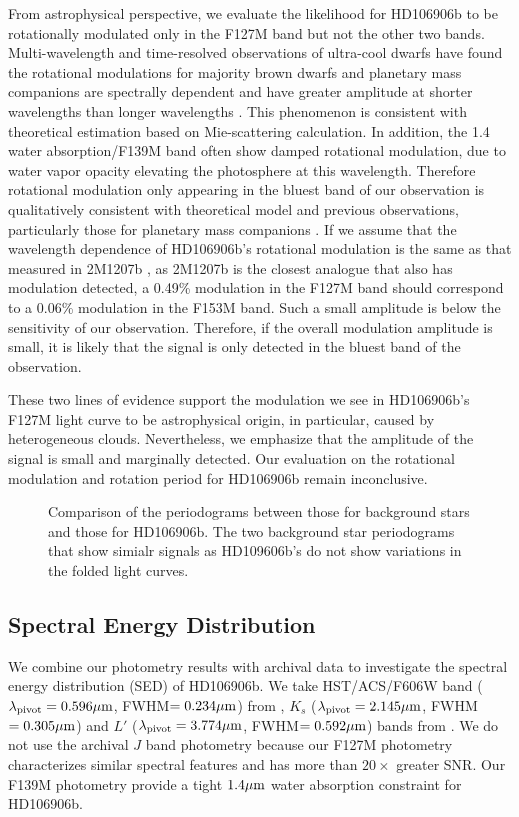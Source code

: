 \documentclass[modern]{aastex62}
\begin{document}
From astrophysical perspective, we evaluate the likelihood for HD106906b to be rotationally modulated only in the F127M band but not the other two bands. Multi-wavelength and time-resolved observations of ultra-cool dwarfs have found the rotational modulations for majority  brown dwarfs and planetary mass companions are spectrally dependent and have greater amplitude at shorter wavelengths than longer wavelengths \citep[e.g.,][]{Zhou2019,Zhou2016,Yang2014,Apai2013,Schlawin}. This phenomenon is consistent with theoretical estimation based on Mie-scattering calculation\citep{Schlawin,Hiranaka2016}. In addition, the 1.4 \micron{} water absorption/F139M band often show damped rotational modulation, due to water vapor opacity elevating the photosphere at this wavelength.  Therefore rotational modulation only appearing in the bluest band of our observation is qualitatively consistent with theoretical model and previous observations, particularly those for planetary mass companions \citep{Zhou2016,Zhou2019}. If we assume that the wavelength dependence of HD106906b's rotational modulation is the same as that measured in 2M1207b \citep{Zhou2016}, as 2M1207b is the closest analogue that also has modulation detected, a 0.49\% modulation in the F127M band should correspond to a 0.06\% modulation in the F153M band. Such a small amplitude is below the sensitivity of our observation. Therefore, if the overall modulation amplitude is small, it is likely that the signal is only detected in the bluest band of the observation.

These two lines of evidence support the modulation we see in HD106906b's F127M light curve to be astrophysical origin, in particular, caused by heterogeneous clouds. Nevertheless, we emphasize that the amplitude of the signal is small and marginally detected. Our evaluation on the rotational modulation and rotation period for HD106906b remain inconclusive.

\begin{figure}
  \centering
  \caption{Comparison of the periodograms between those for background stars and those for HD106906b. The two background star periodograms that show simialr signals as HD109606b's do not show variations in the folded light curves.}
  \label{fig:all-periodograms}
\end{figure}


\subsection{Spectral Energy Distribution}
We combine our photometry results with archival data to investigate the spectral energy distribution (SED) of HD106906b.  We take HST/ACS/F606W band ($\lambda_{\mathrm{pivot}}=0.596\mbox{$\mu$m}$, FWHM$=0.234\mbox{$\mu$m}$) from \citet{Kalas2015}, $K_{s}$ ($\lambda_{\mathrm{pivot}}=2.145\mbox{$\mu$m}$, FWHM$=0.305\mbox{$\mu$m}$) and $L'$ ($\lambda_{\mathrm{pivot}}=3.774\mbox{$\mu$m}$, FWHM$=0.592\mbox{$\mu$m}$) bands from \citet{Bailey2013}. We do not use the archival $J$ band photometry because our F127M photometry characterizes similar spectral features and has more than $20\times$ greater SNR. Our F139M photometry provide a tight $1.4\mbox{$\mu$m}$ water absorption constraint for HD106906b.
\end{document}
